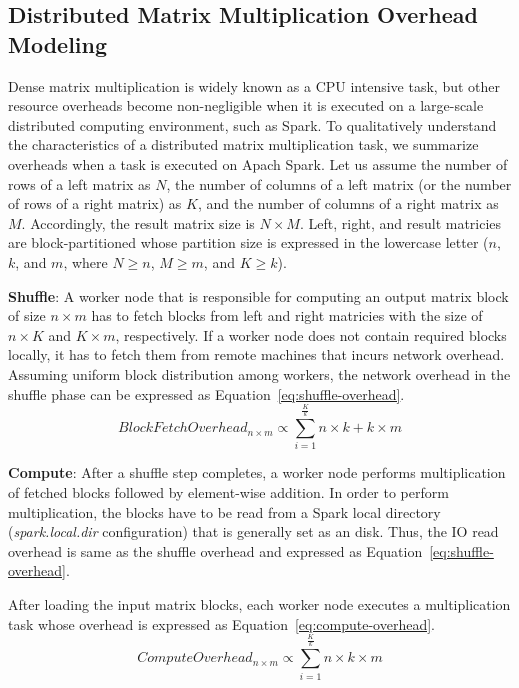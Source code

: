 \documentclass[10pt, conference, compsocconf]{IEEEtran}
\begin{document}
\subsection{Distributed Matrix Multiplication Overhead Modeling}\label{sec:overhead-modeling}
Dense matrix multiplication is widely known as a CPU intensive task, but other resource overheads become non-negligible when it is executed on a large-scale distributed computing environment, such as Spark. To qualitatively understand the characteristics of a distributed matrix multiplication task, we summarize overheads when a task is executed on Apach Spark. Let us assume the number of rows of a left matrix as $N$, the number of columns of a left matrix (or the number of rows of a right matrix) as $K$, and the number of columns of a right matrix as $M$. Accordingly, the result matrix size is $N \times M$. Left, right, and result matricies are block-partitioned whose partition size is expressed in the lowercase letter ($n$, $k$, and $m$, where $N \geq n$, $M \geq m$, and $K \geq k$). 

\textbf{Shuffle}: A worker node that is responsible for computing an output matrix block of size $n \times m$ has to fetch blocks from left and right matricies with the size of $n \times K$ and $K \times m$, respectively. If a worker node does not contain required blocks locally, it has to fetch them from remote machines that incurs network overhead. Assuming uniform block distribution among workers, the network overhead in the shuffle phase can be expressed as Equation~\ref{eq:shuffle-overhead}.
\begin{equation}\label{eq:shuffle-overhead}
  BlockFetchOverhead_{n \times m} \propto \sum\limits_{i=1}^{\frac{K}{k}} n \times k + k \times m
\end{equation}

\textbf{Compute}: After a shuffle step completes, a worker node performs multiplication of fetched blocks followed by element-wise addition. In order to perform multiplication, the blocks have to be read from a Spark local directory (\textit{spark.local.dir} configuration) that is generally set as an disk. Thus, the IO read overhead is same as the shuffle overhead and expressed as Equation~\ref{eq:shuffle-overhead}.

After loading the input matrix blocks, each worker node executes a multiplication task whose overhead is expressed as Equation~\ref{eq:compute-overhead}.
\begin{equation}\label{eq:compute-overhead}
  ComputeOverhead_{n \times m} \propto \sum\limits_{i=1}^{\frac{K}{k}} n \times k \times m
\end{equation}
\end{document}
